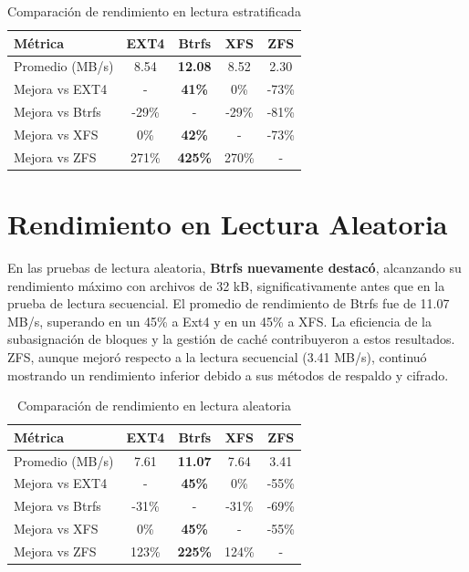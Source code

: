 \begin{table}[h!]
\centering
\caption{Comparación de rendimiento en lectura estratificada}
\begin{tabular}{|l|c|c|c|c|}
\hline
\textbf{Métrica} & \textbf{EXT4} & \textbf{Btrfs} & \textbf{XFS} & \textbf{ZFS} \\ \hline
Promedio (MB/s)   & 8.54          & \textbf{12.08} & 8.52         & 2.30         \\ \hline
Mejora vs EXT4    & -             & \textbf{41\%}  & 0\%          & -73\%        \\ \hline
Mejora vs Btrfs   & -29\%         & -              & -29\%        & -81\%        \\ \hline
Mejora vs XFS     & 0\%           & \textbf{42\%}  & -            & -73\%        \\ \hline
Mejora vs ZFS     & 271\%         & \textbf{425\%} & 270\%        & -            \\ \hline
\end{tabular}
\end{table}

\section{Rendimiento en Lectura Aleatoria}

En las pruebas de lectura aleatoria, \textbf{Btrfs nuevamente destacó}, alcanzando su rendimiento máximo con archivos de 32 kB, significativamente antes que en la prueba de lectura secuencial. El promedio de rendimiento de Btrfs fue de 11.07 MB/s, superando en un 45\% a Ext4 y en un 45\% a XFS. La eficiencia de la subasignación de bloques y la gestión de caché contribuyeron a estos resultados. ZFS, aunque mejoró respecto a la lectura secuencial (3.41 MB/s), continuó mostrando un rendimiento inferior debido a sus métodos de respaldo y cifrado.

\begin{table}[h!]
\centering
\caption{Comparación de rendimiento en lectura aleatoria}
\begin{tabular}{|l|c|c|c|c|}
\hline
\textbf{Métrica} & \textbf{EXT4} & \textbf{Btrfs} & \textbf{XFS} & \textbf{ZFS} \\ \hline
Promedio (MB/s)   & 7.61          & \textbf{11.07} & 7.64         & 3.41         \\ \hline
Mejora vs EXT4    & -             & \textbf{45\%}  & 0\%          & -55\%        \\ \hline
Mejora vs Btrfs   & -31\%         & -              & -31\%        & -69\%        \\ \hline
Mejora vs XFS     & 0\%           & \textbf{45\%}  & -            & -55\%        \\ \hline
Mejora vs ZFS     & 123\%         & \textbf{225\%} & 124\%        & -            \\ \hline
\end{tabular}
\end{table}

